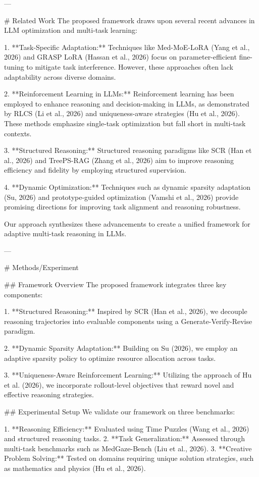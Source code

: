 ---

# Related Work  
The proposed framework draws upon several recent advances in LLM optimization and multi-task learning:  

1. **Task-Specific Adaptation:** Techniques like Med-MoE-LoRA (Yang et al., 2026) and GRASP LoRA (Hassan et al., 2026) focus on parameter-efficient fine-tuning to mitigate task interference. However, these approaches often lack adaptability across diverse domains.  

2. **Reinforcement Learning in LLMs:** Reinforcement learning has been employed to enhance reasoning and decision-making in LLMs, as demonstrated by RLCS (Li et al., 2026) and uniqueness-aware strategies (Hu et al., 2026). These methods emphasize single-task optimization but fall short in multi-task contexts.  

3. **Structured Reasoning:** Structured reasoning paradigms like SCR (Han et al., 2026) and TreePS-RAG (Zhang et al., 2026) aim to improve reasoning efficiency and fidelity by employing structured supervision.  

4. **Dynamic Optimization:** Techniques such as dynamic sparsity adaptation (Su, 2026) and prototype-guided optimization (Vamshi et al., 2026) provide promising directions for improving task alignment and reasoning robustness.  

Our approach synthesizes these advancements to create a unified framework for adaptive multi-task reasoning in LLMs.  

---

# Methods/Experiment  

## Framework Overview  
The proposed framework integrates three key components:  

1. **Structured Reasoning:** Inspired by SCR (Han et al., 2026), we decouple reasoning trajectories into evaluable components using a Generate-Verify-Revise paradigm.  

2. **Dynamic Sparsity Adaptation:** Building on Su (2026), we employ an adaptive sparsity policy to optimize resource allocation across tasks.  

3. **Uniqueness-Aware Reinforcement Learning:** Utilizing the approach of Hu et al. (2026), we incorporate rollout-level objectives that reward novel and effective reasoning strategies.  

## Experimental Setup  
We validate our framework on three benchmarks:  

1. **Reasoning Efficiency:** Evaluated using Time Puzzles (Wang et al., 2026) and structured reasoning tasks.  
2. **Task Generalization:** Assessed through multi-task benchmarks such as MedGaze-Bench (Liu et al., 2026).  
3. **Creative Problem Solving:** Tested on domains requiring unique solution strategies, such as mathematics and physics (Hu et al., 2026).  

